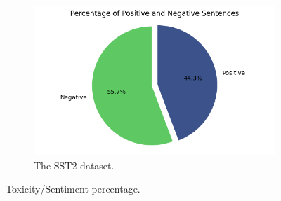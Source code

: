 \documentclass[10pt,a4paper,oneside]{article} %
\begin{document}
\begin{enumerate}
\begin{figure}[h]
    \vspace{0.5cm} 
    \begin{subfigure}{0.5\textwidth}
        \centering
        \includegraphics[width=\textwidth]{replibert/replibert/plots/sentiment_percentage.png} 
        \caption{The SST2 dataset.}
        \label{fig:sentiment_percentage}
    \end{subfigure}
    \caption{Toxicity/Sentiment percentage.}
    \label{fig:tox_sentiment_percentage}
    \end{figure}
\end{enumerate}
\end{document}
